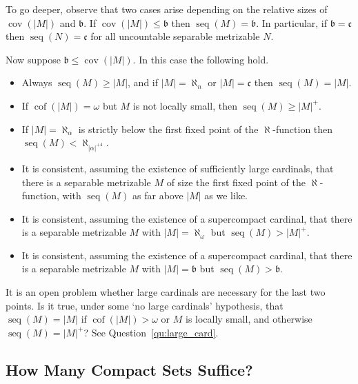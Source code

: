 \documentclass{article}
\DeclareMathOperator{\cof}{cof}
\begin{document}
To go deeper, observe that two cases arise depending on the relative sizes of $\mathop{cov}(|M|)$ and $\mathfrak{b}$.
 If $\mathop{cov}(|M|) \le \mathfrak{b}$ then $\mathop{seq}(M)=\mathfrak{b}$. 
In particular, if $\mathfrak{b}=\mathfrak{c}$ then $\mathop{seq}(N)=\mathfrak{c}$ for all uncountable separable metrizable $N$. 

Now suppose $\mathfrak{b} \le \mathop{cov}(|M|)$. In this case the following hold.
\begin{itemize}[topsep=2pt]
\item Always $\mathop{seq}(M) \ge |M|$, and   if $|M|=\aleph_n$ or $|M|=\mathfrak{c}$ then $\mathop{seq}(M)=|M|$.

\item If $\cof(|M|)=\omega$ but $M$ is not locally small, then $\mathop{seq}(M) \ge |M|^+$.

\item If $|M|=\aleph_\alpha$ is strictly below the first fixed point of the $\aleph$-function then $\mathop{seq}(M) < \aleph_{|\alpha|^{+4}}$. 

\item It is consistent, assuming the existence of sufficiently large cardinals, that there is a separable metrizable $M$ of size the first fixed point of the $\aleph$-function, with $\mathop{seq}(M)$ as far above $|M|$ as we like. 

\item It is consistent, assuming the existence of a supercompact cardinal, that there is a separable metrizable $M$ with $|M|=\aleph_\omega$ but $\mathop{seq}(M) > |M|^+$. 

\item It is consistent, assuming the existence of a supercompact cardinal, that there is a separable metrizable $M$ with $|M| = \mathfrak{b}$ but $\mathop{seq}(M) > \mathfrak{b}$. 
\end{itemize}

It is an open problem whether large cardinals are necessary for the last two points. Is it true, under some `no large cardinals' hypothesis, that $\mathop{seq}(M)=|M|$ if $\cof(|M|)>\omega$ or $M$ is locally small, and otherwise $\mathop{seq}(M)=|M|^+$?
See Question~\ref{qu:large_card}. 





\subsection{How Many Compact Sets Suffice?}\label{ssec:ksam}
\end{document}
